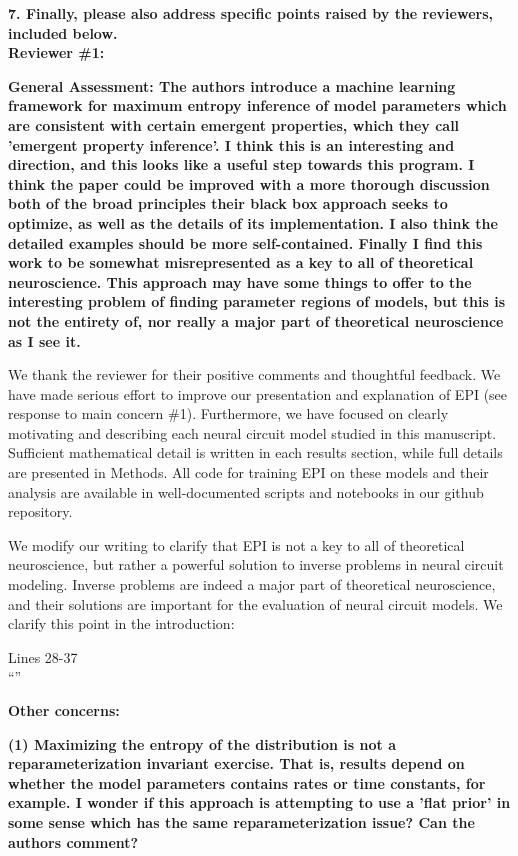 \documentclass[11pt,a4paper]{article}
\begin{document}
\textbf{7. Finally, please also address specific points raised by the reviewers, included below. } \\

{\Large \textbf{Reviewer \#1: }}

\textbf{General Assessment: The authors introduce a machine learning framework for maximum entropy inference of model parameters which are consistent with certain emergent properties, which they call 'emergent property inference'. I think this is an interesting and direction, and this looks like a useful step towards this program. I think the paper could be improved with a more thorough discussion both of the broad principles their black box approach seeks to optimize, as well as the details of its implementation. I also think the detailed examples should be more self-contained. Finally I find this work to be somewhat misrepresented as a key to all of theoretical neuroscience. This approach may have some things to offer to the interesting problem of finding parameter regions of models, but this is not the entirety of, nor really a major part of theoretical neuroscience as I see it. }

We thank the reviewer for their positive comments and thoughtful feedback.
We have made serious effort to improve our presentation and explanation of EPI (see response to main concern \#1).
Furthermore, we have focused on clearly motivating and describing each neural circuit model studied in this manuscript.
Sufficient mathematical detail is written in each results section, while full details are presented in Methods.
All code for training EPI on these models and their analysis are available in well-documented scripts and notebooks in our github repository.

We modify our writing to clarify that EPI is not a key to all of theoretical neuroscience, but rather a powerful solution to inverse problems in neural circuit modeling.
Inverse problems are indeed a major part of theoretical neuroscience, and their solutions are important for the evaluation  of neural circuit models.
We clarify this point in the introduction:

\begin{displayquote}
Lines 28-37 \\
``''
\end{displayquote}

\textbf{Other concerns: }

\textbf{(1) Maximizing the entropy of the distribution is not a reparameterization invariant exercise. That is, results depend on whether the model parameters contains rates or time constants, for example. I wonder if this approach is attempting to use a 'flat prior' in some sense which has the same reparameterization issue? Can the authors comment? }
\end{document}
